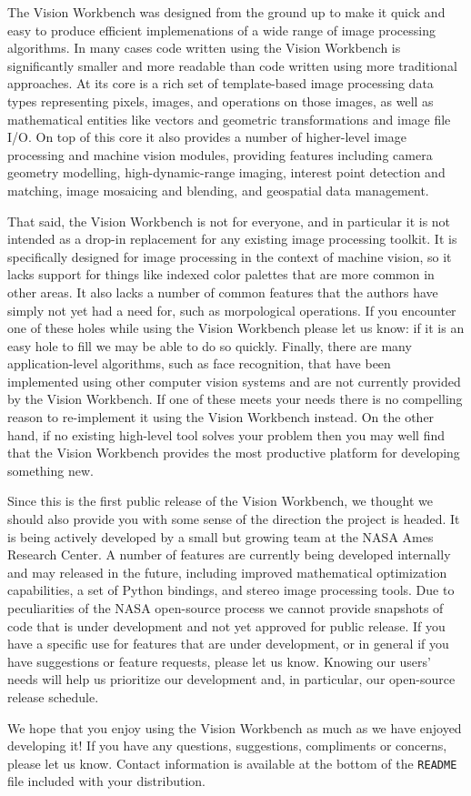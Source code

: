 The Vision Workbench was designed from the ground up to make it quick
and easy to produce efficient implemenations of a wide range of image
processing algorithms.  In many cases code written using the Vision
Workbench is significantly smaller and more readable than code written
using more traditional approaches.  At its core is a rich set of
template-based image processing data types representing pixels,
images, and operations on those images, as well as mathematical
entities like vectors and geometric transformations and image file
I/O.  On top of this core it also provides a number of higher-level
image processing and machine vision modules, providing features
including camera geometry modelling, high-dynamic-range imaging,
interest point detection and matching, image mosaicing and blending,
and geospatial data management.

That said, the Vision Workbench is not for everyone, and in particular
it is not intended as a drop-in replacement for any existing image
processing toolkit.  It is specifically designed for image processing
in the context of machine vision, so it lacks support for things like
indexed color palettes that are more common in other areas.  It also
lacks a number of common features that the authors have simply not yet
had a need for, such as morpological operations.  If you encounter one
of these holes while using the Vision Workbench please let us know: if
it is an easy hole to fill we may be able to do so quickly.  Finally,
there are many application-level algorithms, such as face recognition,
that have been implemented using other computer vision systems and are
not currently provided by the Vision Workbench.  If one of these meets
your needs there is no compelling reason to re-implement it using the
Vision Workbench instead.  On the other hand, if no existing
high-level tool solves your problem then you may well find that the
Vision Workbench provides the most productive platform for developing
something new.

Since this is the first public release of the Vision Workbench, we
thought we should also provide you with some sense of the direction
the project is headed.  It is being actively developed by a small but
growing team at the NASA Ames Research Center.  A number of features
are currently being developed internally and may released in the
future, including improved mathematical optimization capabilities, a
set of Python bindings, and stereo image processing tools.  Due to
peculiarities of the NASA open-source process we cannot provide
snapshots of code that is under development and not yet approved for
public release.  If you have a specific use for features that are
under development, or in general if you have suggestions or feature
requests, please let us know.  Knowing our users' needs will help us
prioritize our development and, in particular, our open-source release
schedule.

We hope that you enjoy using the Vision Workbench as much as we have
enjoyed developing it!  If you have any questions, suggestions,
compliments or concerns, please let us know.  Contact information is
available at the bottom of the \verb#README# file included with your
distribution.
